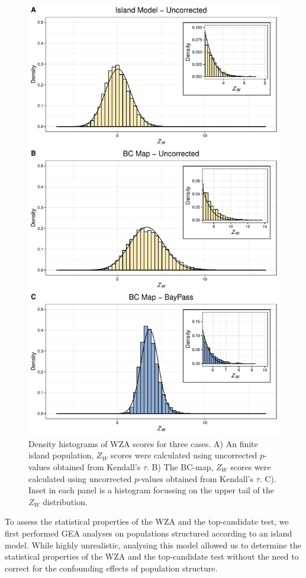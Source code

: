 \documentclass[11pt,twoside,lineno]{GSA_format}
\begin{document}
\begin{figure}[H]
  \includegraphics[width=0.6\linewidth,keepaspectratio]{Plots/neutralResults_histogram.pdf} 

  \caption{Density histograms of WZA scores for three cases. A) An finite island population, $Z_W$ scores were calculated using uncorrected $p$-values obtained from Kendall's $\tau$. B)  The BC-map, $Z_W$ scores were calculated using uncorrected $p$-values obtained from Kendall's $\tau$. C). Inset in each panel is a histogram focussing on the upper tail of the $Z_W$ distribution.}
  
  \label{fig:NeutralHistograms}
\end{figure}




To assess the statistical properties of the WZA and the top-candidate test, we first performed GEA analyses on populations structured according to an island model. While highly unrealistic, analysing this model allowed us to determine the statistical properties of the WZA and the top-candidate test without the need to correct for the confounding effects of population structure. 
\end{document}
